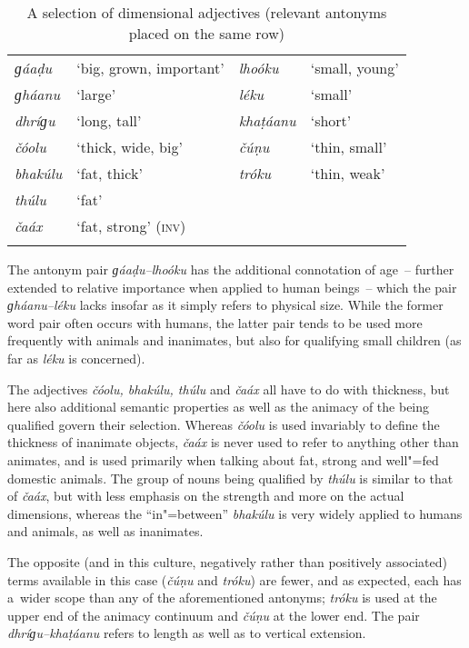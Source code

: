 \begin{table} 
\caption{A selection of dimensional adjectives (relevant antonyms placed on the same row)}
\begin{tabularx}{\textwidth}{ l Q l Q }
\lsptoprule
\textit{ɡáaḍu} &
`big, grown, important' &
\textit{lhoóku} &
`small, young'\\
\textit{ɡháanu} &
`large' &
\textit{léku} &
`small'\\
\textit{dhríɡu} &
`long, tall' &
\textit{khaṭáanu} &
`short'\\
\textit{čóolu} &
`thick, wide, big' &
\textit{čúṇu} &
`thin, small'\\
\textit{bhakúlu} &
`fat, thick' &
\textit{tróku} &
`thin, weak'\\
\textit{thúlu} &
`fat' &
&
\\
\textit{čaáx} &
`fat, strong' (\textsc{inv)} &
&
\\\lspbottomrule
\end{tabularx}
\label{tab:6-dim}
\end{table}


The antonym pair \textit{ɡáaḍu--lhoóku} has the additional connotation of age~-- further extended to relative importance when applied to human beings~-- which the pair \textit{ɡháanu--léku} lacks insofar as it simply refers to physical size. While the former word pair often occurs with humans, the latter pair tends to be used more frequently with animals and inanimates, but also for qualifying small children (as far as \textit{léku} is concerned).


\largerpage[-1]

The adjectives \textit{čóolu, bhakúlu, thúlu} and \textit{čaáx} all have to do with thickness, but here also additional semantic properties as well as the animacy of the  being qualified govern their selection. Whereas \textit{čóolu} is used invariably to define the thickness of inanimate objects, \textit{čaáx} is never used to refer to anything other than animates, and is used primarily when talking about fat, strong and well"=fed domestic animals. The group of nouns being qualified by \textit{thúlu} is similar to that of \textit{čaáx}, but with less emphasis on the strength and more on the actual dimensions, whereas the ``in"=between''  \textit{bhakúlu} is very widely applied to humans and animals, as well as inanimates. 



The opposite (and in this culture, negatively rather than positively associated) terms available in this case (\textit{čúṇu} and \textit{tróku}) are fewer, and as expected, each has a~wider scope than any of the aforementioned antonyms; \textit{tróku} is used at the upper end of the animacy continuum and \textit{čúṇu} at the lower end. The pair \textit{dhríɡu--khaṭáanu} refers to length as well as to vertical extension.


